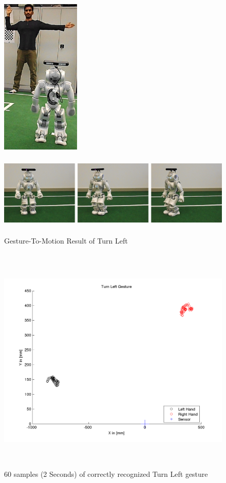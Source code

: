 \begin{figure}
	[h] 
	\begin{minipage}
		{1 
		\textwidth} \centering 
		\includegraphics[height=75mm]{figures/result/usr-turn-left.png} \caption*{} 
	\end{minipage}
	\begin{minipage}
		{1 
		\textwidth} 
		\includegraphics[height=42mm]{figures/result/nao-gm-turn-left.png} 
	\end{minipage}
	\caption{Gesture-To-Motion Result of Turn Left} \label{res:gm:turn:left} 
\end{figure}

\begin{figure}
	[h] \centering 
	\includegraphics[height=110mm]{figures/result/test-turn-left.png} \caption{60 samples (2 Seconds) of correctly recognized Turn Left gesture} 
	\label{res:pl:turn:left}
\end{figure}

